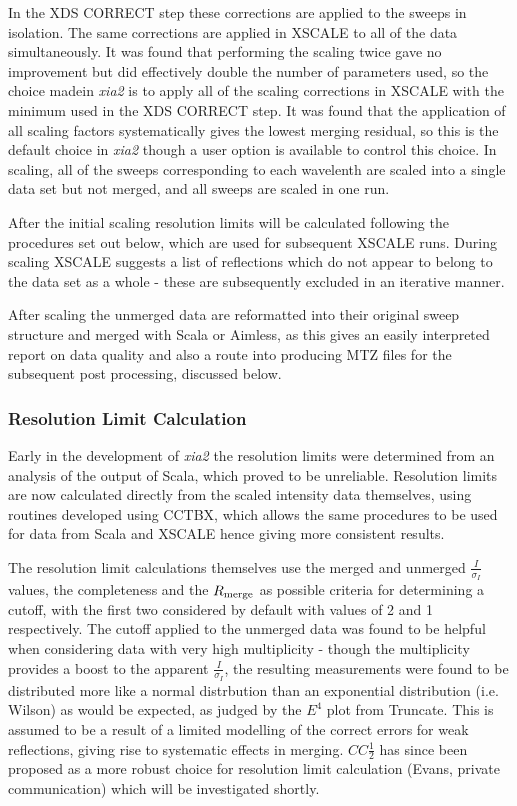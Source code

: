 \documentclass[a4paper,11pt]{article}
\begin{document}
In the XDS CORRECT step these corrections are applied to the sweeps in
isolation. The same corrections are applied in XSCALE to all of the
data simultaneously. It was found that performing the scaling twice
gave no improvement but did effectively double the number of
parameters used, so the choice madein \emph{xia2} is to apply all of
the scaling corrections in XSCALE with the minimum used in the XDS
CORRECT step. It was found that the application of all scaling factors
systematically gives the lowest merging residual, so this is the
default choice in \emph{xia2} though a user option is available to
control this choice. In scaling, all of the sweeps corresponding to
each wavelenth are scaled into a single data set but not merged, and
all sweeps are scaled in one run. 

After the initial scaling resolution limits will be calculated
following the procedures set out below, which are used for subsequent
XSCALE runs. During scaling XSCALE suggests a
list of reflections which do not appear to belong to the data set as a
whole - these are subsequently excluded in an iterative manner.

After scaling the unmerged data are reformatted into their original
sweep structure and merged with Scala or Aimless, as this gives an
easily interpreted report on data quality and also a route into
producing MTZ files for the subsequent post processing, discussed below.

\subsubsection{Resolution Limit Calculation}

Early in the development of \emph{xia2} the resolution limits were
determined from an analysis of the output of Scala, which proved to be
unreliable. Resolution limits are now calculated directly from the
scaled intensity data themselves, using routines developed using
CCTBX, which allows the same procedures to be used for data from Scala
and XSCALE hence giving more consistent results.

The resolution limit calculations themselves use the merged and
unmerged $\frac{I}{\sigma_I}$ values, the completeness and the
$R_{\rm{merge}}$ as possible criteria for determining a cutoff, with
the first two considered by default with values of 2 and 1
respectively. The cutoff applied to the unmerged data was found to be
helpful when considering data with very high multiplicity - though the
multiplicity provides a boost to the apparent $\frac{I}{\sigma_I}$,
the resulting measurements were found to be distributed more like a
normal distrbution than an exponential distribution (i.e. Wilson) as would be
expected, as judged by the $E^4$ plot from Truncate. This is assumed
to be a result of a limited modelling of the correct errors for weak
reflections, giving rise to systematic effects in
merging. $CC\frac{1}{2}$ has since been proposed as a more robust
choice for resolution limit calculation (Evans, private communication)
which will be investigated shortly.
\end{document}
